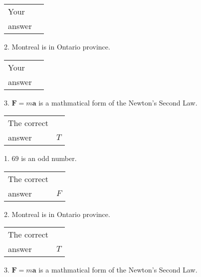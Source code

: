 \documentclass[12pt]{article}
\begin{document}
\noindent\begin{tabular}{|l|l|}\hline Your&\hspace{.2in} \\ answer&\hspace{.2in} \\ \hline \end{tabular}
2.  %
Montreal is in  %
Ontario province.
 
\noindent\begin{tabular}{|l|l|}\hline Your&\hspace{.2in} \\ answer&\hspace{.2in} \\ \hline \end{tabular}
3.  %
$\mathbf{F}=m\mathbf{a}$ is a mathmatical form of
the Newton's Second Law.
 
 
 
\noindent{}
 
 

 
\noindent\begin{tabular}{|l|l|}\hline The correct & \\
          answer &  %
$T$ \\ \hline \end{tabular}
1. $ %
69$ is an  %
odd number.
 
\noindent\begin{tabular}{|l|l|}\hline The correct & \\
          answer &  %
$F$ \\ \hline \end{tabular}
2.  %
Montreal is in  %
Ontario province.
 
\noindent\begin{tabular}{|l|l|}\hline The correct & \\
          answer &  %
$T$ \\ \hline \end{tabular}
3.  %
$\mathbf{F}=m\mathbf{a}$ is a mathmatical form of  %
the Newton's Second Law.
 
 
 
\noindent{}
 
 

 
\vspace{0.3in}
   
   
   
\end{document}
